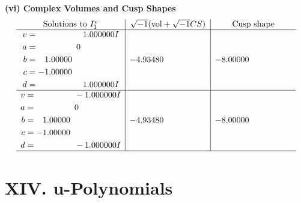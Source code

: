 \documentclass[1p]{elsarticle_modified}
\theoremstyle{definition}
\newcommand{\I}{\sqrt{-1}}
\begin{document}
\newpage\flushleft \textbf{(vi) Complex Volumes and Cusp Shapes}
$$\begin{array}{c|c|c}  
\text{Solutions to }I^v_{1}& \I (\text{vol} + \sqrt{-1}CS) & \text{Cusp shape}\\
 \hline 
\begin{aligned}
v &= \phantom{-0.000000 -}1.000000 I \\
a &= \phantom{-0.000000 } 0 \\
b &= \phantom{-}1.00000\phantom{ +0.000000I} \\
c &= -1.00000\phantom{ +0.000000I} \\
d &= \phantom{-0.000000 -}1.000000 I\end{aligned}
 & -4.93480\phantom{ +0.000000I} & -8.00000\phantom{ +0.000000I} \\ \hline\begin{aligned}
v &= \phantom{-0.000000 } -1.000000 I \\
a &= \phantom{-0.000000 } 0 \\
b &= \phantom{-}1.00000\phantom{ +0.000000I} \\
c &= -1.00000\phantom{ +0.000000I} \\
d &= \phantom{-0.000000 } -1.000000 I\end{aligned}
 & -4.93480\phantom{ +0.000000I} & -8.00000\phantom{ +0.000000I}\\
 \hline 
 \end{array}$$\newpage
\newpage\renewcommand{\arraystretch}{1}
\centering \section*{ XIV. u-Polynomials}
\end{document}
